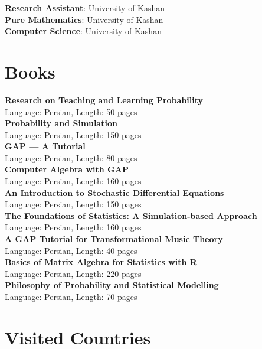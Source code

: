 \documentclass[a4paper,10pt]{article}
\begin{document}
\textbf{Research Assistant}: University of Kashan\\
\textbf{Pure Mathematics}: University of Kashan\\
\textbf{Computer Science}: University of Kashan\\


\section{\textbf{Books}}
\textbf{Research on Teaching and Learning Probability}\\Language: Persian, Length: 50 pages\\


\textbf{Probability and Simulation}\\
Language: Persian, Length: 150 pages\\


\textbf{GAP — A Tutorial}\\
Language: Persian, Length: 80 pages\\


\textbf{Computer Algebra with GAP}\\
Language: Persian, Length: 160 pages\\


\textbf{An Introduction to Stochastic Differential Equations}\\
Language: Persian, Length: 150 pages\\


\textbf{The Foundations of Statistics: A Simulation-based Approach}\\
Language: Persian, Length: 160 pages\\


\textbf{A GAP Tutorial for Transformational Music Theory}\\
Language: Persian, Length: 40 pages\\

\textbf{Basics of Matrix Algebra for Statistics with R}\\
Language: Persian, Length: 220 pages\\


\textbf{Philosophy of Probability and Statistical Modelling}\\
Language: Persian, Length: 70 pages\\



\section{\textbf{Visited Countries}}
\end{document}
